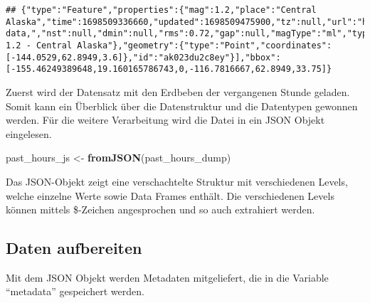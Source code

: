 \documentclass[
]{article}
\newenvironment{Shaded}{\begin{snugshade}}{\end{snugshade}}
\newcommand{\FunctionTok}[1]{\textcolor[rgb]{0.13,0.29,0.53}{\textbf{#1}}}
\newcommand{\NormalTok}[1]{#1}
\newcommand{\OtherTok}[1]{\textcolor[rgb]{0.56,0.35,0.01}{#1}}
\newcommand{\SpecialCharTok}[1]{\textcolor[rgb]{0.81,0.36,0.00}{\textbf{#1}}}
\begin{document}
\begin{verbatim}
## {"type":"Feature","properties":{"mag":1.2,"place":"Central Alaska","time":1698509336660,"updated":1698509475900,"tz":null,"url":"https://earthquake.usgs.gov/earthquakes/eventpage/ak023du2c8ey","detail":"https://earthquake.usgs.gov/earthquakes/feed/v1.0/detail/ak023du2c8ey.geojson","felt":null,"cdi":null,"mmi":null,"alert":null,"status":"automatic","tsunami":0,"sig":22,"net":"ak","code":"023du2c8ey","ids":",ak023du2c8ey,","sources":",ak,","types":",origin,phase-data,","nst":null,"dmin":null,"rms":0.72,"gap":null,"magType":"ml","type":"earthquake","title":"M 1.2 - Central Alaska"},"geometry":{"type":"Point","coordinates":[-144.0529,62.8949,3.6]},"id":"ak023du2c8ey"}],"bbox":[-155.46249389648,19.160165786743,0,-116.7816667,62.8949,33.75]}
\end{verbatim}

Zuerst wird der Datensatz mit den Erdbeben der vergangenen Stunde
geladen. Somit kann ein Überblick über die Datenstruktur und die
Datentypen gewonnen werden. Für die weitere Verarbeitung wird die Datei
in ein JSON Objekt eingelesen.

\begin{Shaded}
\begin{Highlighting}[]
\NormalTok{past\_hours\_js }\OtherTok{\textless{}{-}} \FunctionTok{fromJSON}\NormalTok{(past\_hours\_dump)}
\end{Highlighting}
\end{Shaded}

Das JSON-Objekt zeigt eine verschachtelte Struktur mit verschiedenen
Levels, welche einzelne Werte sowie Data Frames enthält. Die
verschiedenen Levels können mittels \$-Zeichen angesprochen und so auch
extrahiert werden.

\hypertarget{daten-aufbereiten}{%
\subsection{Daten aufbereiten}\label{daten-aufbereiten}}

Mit dem JSON Objekt werden Metadaten mitgeliefert, die in die Variable
``metadata'' gespeichert werden.

\begin{Shaded}
\end{Shaded}
\end{document}
